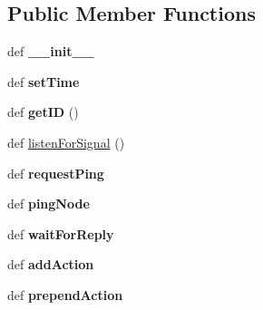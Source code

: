 \subsection*{Public Member Functions}
\begin{DoxyCompactItemize}
\item 
\mbox{\label{classsimlib_1_1anchor_1_1_anchor_a7f9c8d88a2b75c6906c7b3c407122253}} 
def {\bfseries \+\_\+\+\_\+init\+\_\+\+\_\+}
\item 
\mbox{\label{classsimlib_1_1anchor_1_1_anchor_a07919385fe2be01caa5b21ecda72994a}} 
def {\bfseries set\+Time}
\item 
\mbox{\label{classsimlib_1_1anchor_1_1_anchor_aad6e8cef879578483a4b76a82719b7bd}} 
def {\bfseries get\+ID} ()
\item 
def \mbox{\hyperlink{classsimlib_1_1anchor_1_1_anchor_a1bfd4394f56d62e710ed4df8367cb5a3}{listen\+For\+Signal}} ()
\item 
\mbox{\label{classsimlib_1_1anchor_1_1_anchor_a99648f62d73c149e1683b829c3e3763c}} 
def {\bfseries request\+Ping}
\item 
\mbox{\label{classsimlib_1_1anchor_1_1_anchor_a7fb5450523f88349670ecaee772996bc}} 
def {\bfseries ping\+Node}
\item 
\mbox{\label{classsimlib_1_1anchor_1_1_anchor_ac9c49d6bb6cb2e736221dde820da32cd}} 
def {\bfseries wait\+For\+Reply}
\item 
\mbox{\label{classsimlib_1_1anchor_1_1_anchor_a4766235728733695b9309020504d646e}} 
def {\bfseries add\+Action}
\item 
\mbox{\label{classsimlib_1_1anchor_1_1_anchor_ad6a0662edca4f31fdb1f2e1ddc3f14f9}} 
def {\bfseries prepend\+Action}
\end{DoxyCompactItemize}
